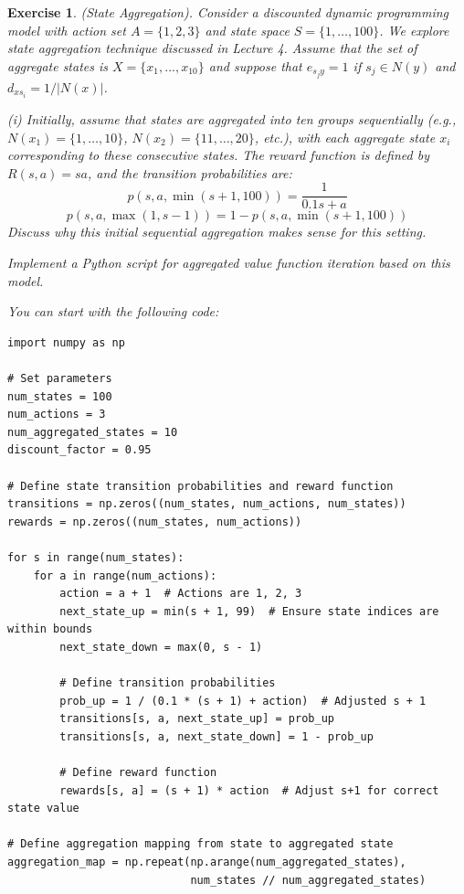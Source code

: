 \documentclass[letter,11pt]{article}
\newtheorem{exercise}{Exercise}[section]
\begin{document}
\begin{exercise} (State Aggregation). 
    Consider a discounted dynamic programming model with action set $A = \{1, 2, 3\}$ and state space $S = \{1, \dots, 100\}$. We explore state aggregation technique discussed in Lecture 4. Assume that the set of aggregate states is $X=\{x_{1},\ldots,x_{10} \}$ and suppose that  $e_{s_{j}y} = 1$ if $s_{j} \in N(y)$ and $d_{xs_{i}} = 1/|N(x)|$.

   (i) Initially, assume that states are aggregated into ten groups sequentially (e.g., $N(x_1) = \{1, \dots, 10\}$, $N(x_2) = \{11, \dots, 20\}$, etc.), with each aggregate state \(x_i\) corresponding to these consecutive states. The reward function is defined by $R(s, a) = sa$, and the transition probabilities are:
    \[ p(s, a, \min(s + 1, 100)) = \frac{1}{0.1s + a} \]
    \[ p(s, a, \max(1, s - 1)) = 1 - p(s, a, \min(s + 1, 100)) \]
    Discuss why this initial sequential aggregation makes sense for this setting. 
    
    Implement a Python script for aggregated value function iteration based on this model.

    You can start with the following code: 

 \begin{lstlisting}
import numpy as np

# Set parameters
num_states = 100
num_actions = 3
num_aggregated_states = 10
discount_factor = 0.95

# Define state transition probabilities and reward function
transitions = np.zeros((num_states, num_actions, num_states))
rewards = np.zeros((num_states, num_actions))

for s in range(num_states):
    for a in range(num_actions):
        action = a + 1  # Actions are 1, 2, 3
        next_state_up = min(s + 1, 99)  # Ensure state indices are within bounds
        next_state_down = max(0, s - 1)
        
        # Define transition probabilities
        prob_up = 1 / (0.1 * (s + 1) + action)  # Adjusted s + 1
        transitions[s, a, next_state_up] = prob_up
        transitions[s, a, next_state_down] = 1 - prob_up
        
        # Define reward function
        rewards[s, a] = (s + 1) * action  # Adjust s+1 for correct state value

# Define aggregation mapping from state to aggregated state
aggregation_map = np.repeat(np.arange(num_aggregated_states), 
                            num_states // num_aggregated_states)
 \end{lstlisting}


\end{exercise}
\end{document}

